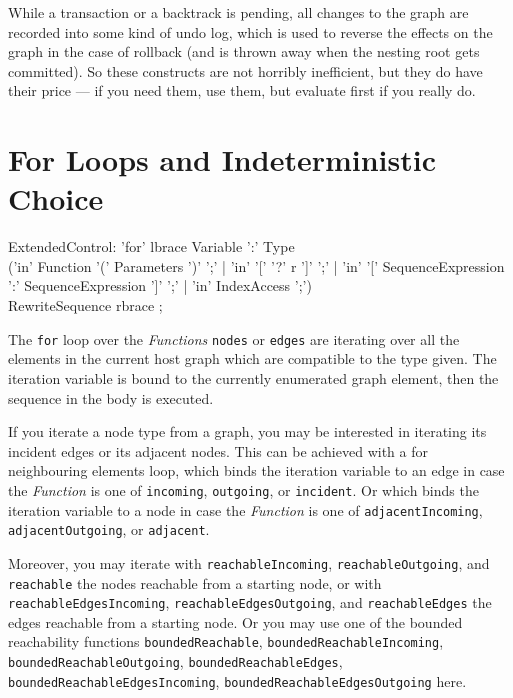 \begin{note}
While a transaction or a backtrack is pending, all changes to the graph are recorded into some kind of undo log, which is used to reverse the effects on the graph in the case of rollback (and is thrown away when the nesting root gets committed).
So these constructs are not horribly inefficient, but they do have their price --- if you need them, use them, but evaluate first if you really do.
\end{note}


\section{For Loops and Indeterministic Choice}\label{sec:indetchoice}

\begin{rail}
  ExtendedControl:
    'for' lbrace Variable ':' Type\\
    ('in' Function '(' Parameters ')' ';' |
    'in' '[' '?' r ']' ';' |
		'in' '[' SequenceExpression ':' SequenceExpression ']' ';' |
		'in' IndexAccess ';')\\
    RewriteSequence rbrace
    ;
\end{rail}\label{forgraphelem}\label{forincidentadjacent}\label{formatch}

The \texttt{for} loop over the \emph{Functions} \texttt{nodes} or \texttt{edges} are iterating over all the elements in the current host graph which are compatible to the type given.
The iteration variable is bound to the currently enumerated graph element, then the sequence in the body is executed.

If you iterate a node type from a graph, you may be interested in iterating its incident edges or its adjacent nodes.
This can be achieved with a for neighbouring elements loop, which binds the iteration variable to an edge in case the \emph{Function} is one of \texttt{incoming}, \texttt{outgoing}, or \texttt{incident}. 
Or which binds the iteration variable to a node in case the \emph{Function} is one of \texttt{adjacentIncoming}, \texttt{adjacentOutgoing}, or \texttt{adjacent}.

Moreover, you may iterate with \texttt{reachable\-Incoming}, \texttt{reachable\-Outgoing}, and \texttt{reachable} the nodes reachable from a starting node, or with \texttt{reachable\-Edges\-Incoming}, \texttt{reachable\-Edges\-Outgoing}, and \texttt{reachable\-Edges} the edges reachable from a starting node.
Or you may use one of the bounded reachability functions \texttt{bounded\-Reachable}, \texttt{bounded\-Reachable\-Incoming}, \texttt{bounded\-Reachable\-Outgoing}, \texttt{bounded\-Reachable\-Edges}, \texttt{bounded\-Reachable\-Edges\-Incoming}, \texttt{bounded\-Reachable\-Edges\-Outgoing} here.

